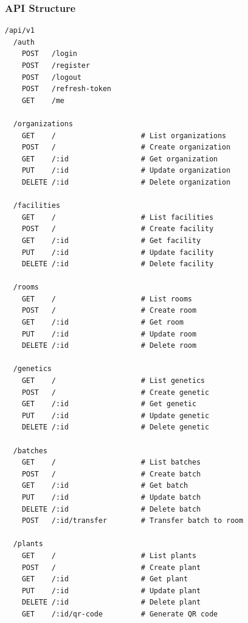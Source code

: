 \documentclass[11pt,a4paper]{article}
\begin{document}
\subsubsection{API Structure}
\begin{codebox}
\begin{verbatim}
/api/v1
  /auth
    POST   /login
    POST   /register
    POST   /logout
    POST   /refresh-token
    GET    /me
  
  /organizations
    GET    /                    # List organizations
    POST   /                    # Create organization
    GET    /:id                 # Get organization
    PUT    /:id                 # Update organization
    DELETE /:id                 # Delete organization
  
  /facilities
    GET    /                    # List facilities
    POST   /                    # Create facility
    GET    /:id                 # Get facility
    PUT    /:id                 # Update facility
    DELETE /:id                 # Delete facility
  
  /rooms
    GET    /                    # List rooms
    POST   /                    # Create room
    GET    /:id                 # Get room
    PUT    /:id                 # Update room
    DELETE /:id                 # Delete room
  
  /genetics
    GET    /                    # List genetics
    POST   /                    # Create genetic
    GET    /:id                 # Get genetic
    PUT    /:id                 # Update genetic
    DELETE /:id                 # Delete genetic
  
  /batches
    GET    /                    # List batches
    POST   /                    # Create batch
    GET    /:id                 # Get batch
    PUT    /:id                 # Update batch
    DELETE /:id                 # Delete batch
    POST   /:id/transfer        # Transfer batch to room
  
  /plants
    GET    /                    # List plants
    POST   /                    # Create plant
    GET    /:id                 # Get plant
    PUT    /:id                 # Update plant
    DELETE /:id                 # Delete plant
    GET    /:id/qr-code         # Generate QR code
\end{verbatim}
\end{codebox}
\end{document}
